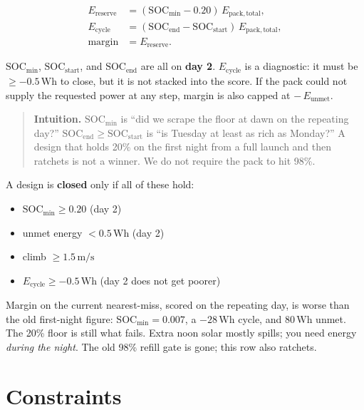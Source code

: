 \documentclass[11pt,letterpaper]{article}
\newenvironment{intuition}{\begin{quote}\small}{\end{quote}}
\begin{document}
\begin{align}
  E_\mathrm{reserve}
    &= (\mathrm{SOC}_\mathrm{min} - 0.20)\,E_\mathrm{pack,total}, \\
  E_\mathrm{cycle}
    &= (\mathrm{SOC}_\mathrm{end} - \mathrm{SOC}_\mathrm{start})\,E_\mathrm{pack,total}, \\
  \mathrm{margin}
    &= E_\mathrm{reserve}.
\end{align}

$\mathrm{SOC}_\mathrm{min}$, $\mathrm{SOC}_\mathrm{start}$, and $\mathrm{SOC}_\mathrm{end}$ are all on \textbf{day 2}. $E_\mathrm{cycle}$ is a diagnostic: it must be $\ge -0.5\,\mathrm{Wh}$ to close, but it is not stacked into the score. If the pack could not supply the requested power at any step, margin is also capped at $-\,E_\mathrm{unmet}$.

\begin{intuition}
\textbf{Intuition.} $\mathrm{SOC}_\mathrm{min}$ is ``did we scrape the floor at dawn on the repeating day?'' $\mathrm{SOC}_\mathrm{end} \ge \mathrm{SOC}_\mathrm{start}$ is ``is Tuesday at least as rich as Monday?'' A design that holds 20\% on the first night from a full launch and then ratchets is not a winner. We do not require the pack to hit 98\%.
\end{intuition}

A design is \textbf{closed} only if all of these hold:

\begin{itemize}
  \item $\mathrm{SOC}_\mathrm{min} \ge 0.20$ (day 2)
  \item unmet energy $< 0.5\,\mathrm{Wh}$ (day 2)
  \item climb $\ge 1.5\,\mathrm{m/s}$
  \item $E_\mathrm{cycle} \ge -0.5\,\mathrm{Wh}$ (day 2 does not get poorer)
\end{itemize}

Margin on the current nearest-miss, scored on the repeating day, is worse than the old first-night figure: $\mathrm{SOC}_\mathrm{min} = 0.007$, a $-28\,\mathrm{Wh}$ cycle, and $80\,\mathrm{Wh}$ unmet. The 20\% floor is still what fails. Extra noon solar mostly spills; you need energy \emph{during the night}. The old 98\% refill gate is gone; this row also ratchets.

\section{Constraints}
\end{document}
